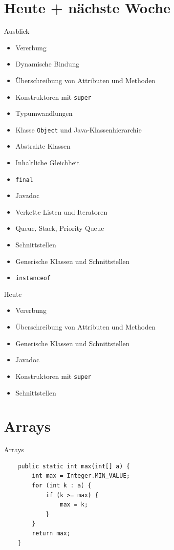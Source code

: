 \documentclass[18pt]{beamer}
\begin{document}
\section{Heute + nächste Woche}
\begin{frame}[fragile]{Ausblick}
\begin{itemize}
 \item Vererbung
 \item Dynamische Bindung
 \item Überschreibung von Attributen und Methoden
 \item Konstruktoren mit \verb|super|
 \item Typumwandlungen
 \item Klasse \verb|Object| und Java-Klassenhierarchie
 \item Abstrakte Klassen
 \item Inhaltliche Gleichheit
 \item \verb|final|
 \item Javadoc
 \item Verkette Listen und Iteratoren
 \item Queue, Stack, Priority Queue
 \item Schnittstellen
 \item Generische Klassen und Schnittstellen
  \item \verb|instanceof|
\end{itemize}
\end{frame}

\begin{frame}[fragile]{Heute}
\begin{itemize}
 \item Vererbung
 \item Überschreibung von Attributen und Methoden
 \item Generische Klassen und Schnittstellen
 \item Javadoc
 \item Konstruktoren mit \verb|super|
 \item Schnittstellen 
\end{itemize}
\end{frame}

\section{Arrays} %


\begin{frame}[fragile]{Arrays}
 \begin{lstlisting}
    public static int max(int[] a) {
        int max = Integer.MIN_VALUE;
        for (int k : a) {
            if (k >= max) {
                max = k;
            }
        }
        return max;
    }
 \end{lstlisting}
\end{frame}
\end{document}
